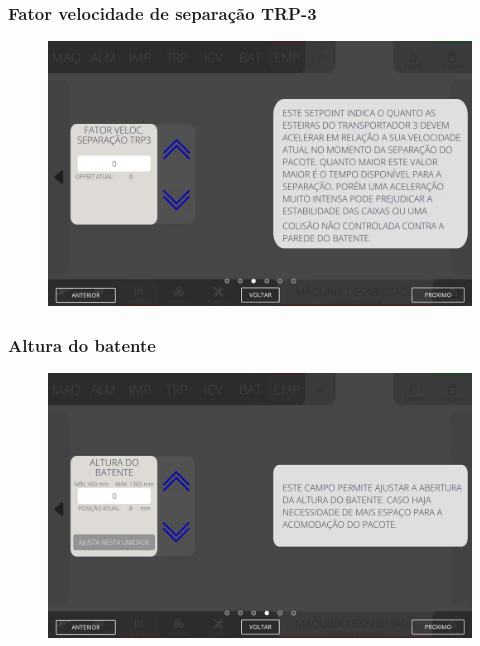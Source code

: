 \newpage
\thispagestyle{fancy}
\vspace*{40 pt}
\subsubsection{\small{Fator velocidade de separação TRP-3}} \label{sec:telaAjustesEmpilhadorFatorVelocidadeSeparacaoTRP3}
\vspace*{\fill}
\begin{figure}[h]
    \centering
    \includegraphics[width=576 px,height=360 px]{src/imagesICV/08-stacker/settings/9.png}
\end{figure}
\vspace*{\fill}

\newpage
\thispagestyle{fancy}
\vspace*{40 pt}
\subsubsection{\small{Altura do batente}} \label{sec:telaAjustesEmpilhadorAlturaBatente}
\vspace*{\fill}
\begin{figure}[h]
    \centering
    \includegraphics[width=576 px,height=360 px]{src/imagesICV/08-stacker/settings/10.png}
\end{figure}
\vspace*{\fill}

